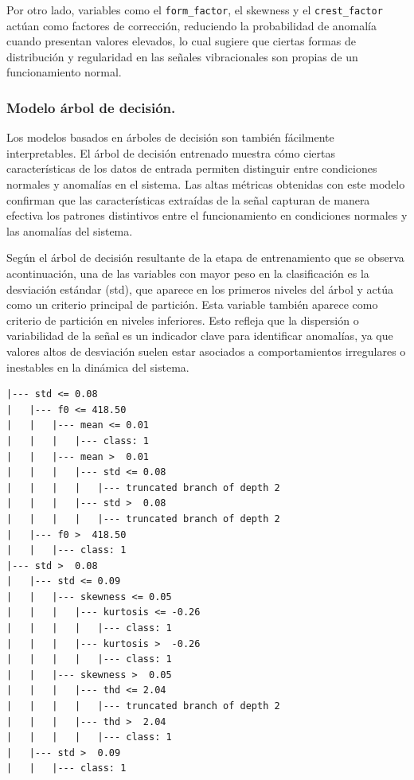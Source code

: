 \documentclass[11pt,a4paper,spanish]{book}
\numberwithin{equation}{chapter}
\numberwithin{figure}{chapter}
\begin{document}
Por otro lado, variables como el \lstinline|form_factor|, el skewness y el \lstinline|crest_factor| actúan como factores de corrección, reduciendo la probabilidad de anomalía cuando presentan valores elevados, lo cual sugiere que ciertas formas de distribución y regularidad en las señales vibracionales son propias de un funcionamiento normal. 



\subsubsection{Modelo árbol de decisión.}

Los modelos basados en árboles de decisión son también fácilmente interpretables. El árbol de decisión entrenado muestra cómo ciertas características de los datos de entrada permiten distinguir entre condiciones normales y anomalías en el sistema. Las altas métricas obtenidas con este modelo confirman que las características extraídas de la señal capturan de manera efectiva los patrones distintivos entre el funcionamiento en condiciones normales y las anomalías del sistema.


Según el árbol de decisión resultante de la etapa de entrenamiento que se observa acontinuación, una de las variables con mayor peso en la clasificación es la desviación estándar (std), que aparece en los primeros niveles del árbol y actúa como un criterio principal de partición. Esta variable también aparece como criterio de partición en niveles inferiores. Esto refleja que la dispersión o variabilidad de la señal es un indicador clave para identificar anomalías, ya que valores altos de desviación suelen estar asociados a comportamientos irregulares o inestables en la dinámica del sistema.

\vspace{5mm}
\begin{lstlisting}[language={}, basicstyle=\ttfamily\footnotesize\color{black}, frame=lines]
|--- std <= 0.08
|   |--- f0 <= 418.50
|   |   |--- mean <= 0.01
|   |   |   |--- class: 1
|   |   |--- mean >  0.01
|   |   |   |--- std <= 0.08
|   |   |   |   |--- truncated branch of depth 2
|   |   |   |--- std >  0.08
|   |   |   |   |--- truncated branch of depth 2
|   |--- f0 >  418.50
|   |   |--- class: 1
|--- std >  0.08
|   |--- std <= 0.09
|   |   |--- skewness <= 0.05
|   |   |   |--- kurtosis <= -0.26
|   |   |   |   |--- class: 1
|   |   |   |--- kurtosis >  -0.26
|   |   |   |   |--- class: 1
|   |   |--- skewness >  0.05
|   |   |   |--- thd <= 2.04
|   |   |   |   |--- truncated branch of depth 2
|   |   |   |--- thd >  2.04
|   |   |   |   |--- class: 1
|   |--- std >  0.09
|   |   |--- class: 1
\end{lstlisting}
\end{document}

